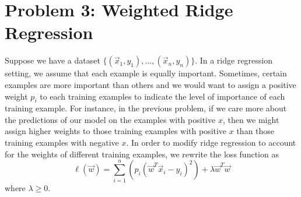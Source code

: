 \documentclass[11pt]{article}
\begin{document}
	\section*{Problem 3: Weighted Ridge Regression}
	Suppose we have a dataset $\{(\vec{x}_1, y_1), ..., (\vec{x}_n, y_n)\}$. In a ridge regression setting, we assume that each example is equally important. Sometimes, certain examples are more important than others and we would want to assign a positive weight $p_i$ to each training examples to indicate the level of importance of each training example. For instance, in the previous problem, if we care more about the predictions of our model on the examples with positive $x$, then we might assign higher weights to those training examples with positive $x$ than those training examples with negative $x$.
	\newline
	\newline
	In order to modify ridge regression to account for the weights of different training examples, we rewrite the loss function as
	$$\ell(\vec{w}) = \sum_{i = 1}^{n}(p_i(\vec{w}^T\vec{x}_i - y_i)^2) + \lambda \vec{w}^T \vec{w}$$ where $\lambda \geq 0$.
\end{document}
